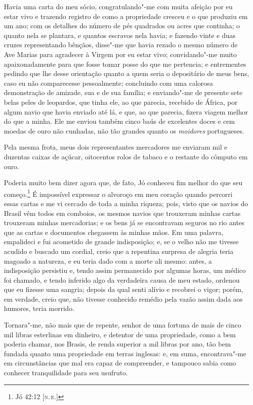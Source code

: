 Havia uma carta do meu sócio, congratulando"-me com muita afeição por eu
estar vivo e trazendo registro de como a propriedade cresceu e o que
produziu em um ano; com os detalhes do número de pés quadrados ou acres
que continha; o quanto nela se plantara, e quantos escravos nela havia;
e fazendo vinte e duas cruzes representando bênçãos, disse"-me que havia
rezado o mesmo número de Ave Marias para agradecer à Virgem por eu estar
vivo; convidando"-me muito apaixonadamente para que fosse tomar posse do
que me pertencia; e entrementes pedindo que lhe desse orientação quanto
a quem seria o depositário de meus bens, caso eu não comparecesse
pessoalmente; concluindo com uma calorosa demonstração de amizade, sua e
de sua família; e enviando"-me de presente sete belas peles de leopardos,
que tinha ele, ao que parecia, recebido de África, por algum navio que
havia enviado até lá, e que, ao que parecia, fizera viagem melhor do que
a minha. Ele me enviou também cinco baús de excelentes doces e cem
moedas de ouro não cunhadas, não tão grandes quanto os \emph{moidores}
portugueses.

Pela mesma frota, meus dois representantes mercadores me enviaram mil e
duzentas caixas de açúcar, oitocentos rolos de tabaco e o restante do
cômputo em ouro.

Poderia muito bem dizer agora que, de fato, Jó conheceu fim melhor do
que seu começo.\footnote{Jó 42:12 {[}\textsc{n.\,e.}{]}} É impossível expressar o
alvoroço em meu coração quando percorri essas cartas e me vi cercado de
toda a minha riqueza; pois, visto que os navios do Brasil vêm todos em
comboios, os mesmos navios que trouxeram minhas cartas trouxeram minhas
mercadorias; e os bens já se encontravam seguros no rio antes que as
cartas e documentos chegassem às minhas mãos. Em uma palavra, empalideci
e fui acometido de grande indisposição; e, se o velho não me tivesse
acudido e buscado um cordial, creio que a repentina surpresa de alegria
teria magoado a natureza, e eu teria dado com a morte ali mesmo: antes,
a indisposição persistiu e, tendo assim permanecido por algumas horas,
um médico foi chamado, e tendo inferido algo da verdadeira causa de meu
estado, ordenou que eu fizesse uma sangria; depois da qual senti alívio
e recobrei o vigor; porém, em verdade, creio que, não tivesse conhecido
remédio pela vazão assim dada aos humores, teria morrido.

Tornara"-me, não mais que de repente, senhor de uma fortuna de mais de
cinco mil libras esterlinas em dinheiro, e detentor de uma propriedade,
como a bem poderia chamar, nos Brasis, de renda superior a mil libras
por ano, tão bem fundada quanto uma propriedade em terras inglesas: e,
em suma, encontrava"-me em circunstâncias que mal era capaz de
compreender, e tampouco sabia como conhecer tranquilidade para seu
usufruto.

